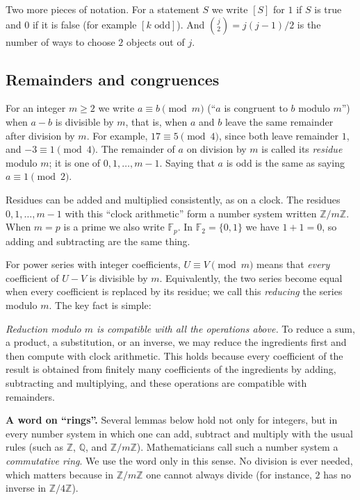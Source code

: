 \documentclass[11pt,a4paper]{article}
\theoremstyle{definition}
\theoremstyle{remark}
\newcommand{\Z}{\mathbb{Z}}
\newcommand{\Q}{\mathbb{Q}}
\newcommand{\F}{\mathbb{F}}
\newcommand{\para}[1]{\par\medskip\noindent\textbf{#1}\enspace}
\begin{document}
Two more pieces of notation. For a statement $S$ we write $[S]$ for $1$ if $S$ is true and $0$ if it is false
(for example $[k\text{ odd}]$). And $\binom{j}{2}=j(j-1)/2$ is the number of ways to choose $2$ objects out of $j$.

\subsection{Remainders and congruences}
For an integer $m\ge2$ we write $a\equiv b\pmod m$ (``$a$ is congruent to $b$ modulo $m$'') when $a-b$ is divisible by
$m$, that is, when $a$ and $b$ leave the same remainder after division by $m$. For example, $17\equiv5\pmod 4$, since both leave remainder $1$, and $-3\equiv1\pmod4$. The
remainder of $a$ on division by $m$ is called its \emph{residue} modulo $m$; it is one of $0,1,\dots,m-1$. Saying that
$a$ is odd is the same as saying $a\equiv1\pmod2$.

Residues can be added and multiplied consistently, as on a clock. The residues $0,1,\dots,m-1$ with this ``clock
arithmetic'' form a number system written $\Z/m\Z$. When $m=p$ is a prime we also write $\F_p$. In $\F_2=\{0,1\}$ we
have $1+1=0$, so adding and subtracting are the same thing.

For power series with integer coefficients, $U\equiv V\pmod m$ means that \emph{every} coefficient of $U-V$ is
divisible by $m$. Equivalently, the two series become equal when every coefficient is replaced by its residue; we call
this \emph{reducing} the series modulo $m$. The key fact is simple:

\emph{Reduction modulo $m$ is compatible with all the operations above.} To reduce a sum, a product, a substitution, or
an inverse, we may reduce the ingredients first and then compute with clock arithmetic. This holds because every
coefficient of the result is obtained from finitely many coefficients of the ingredients by adding, subtracting and
multiplying, and these operations are compatible with remainders.

\para{A word on ``rings''.} Several lemmas below hold not only for integers, but in every number system in
which one can add, subtract and multiply with the usual rules (such as $\Z$, $\Q$, and $\Z/m\Z$). Mathematicians call
such a number system a \emph{commutative ring}. We use the word only in this sense. No division is ever needed, which
matters because in $\Z/m\Z$ one cannot always divide (for instance, $2$ has no inverse in $\Z/4\Z$).
\end{document}
